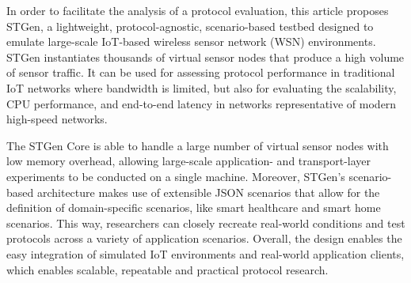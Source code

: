 \documentclass[jsan,article,submit,moreauthors,pdftex]{Definitions/mdpi}
\begin{document}
In order to facilitate the analysis of a protocol evaluation, this article proposes STGen, a lightweight, protocol-agnostic, scenario-based testbed designed to emulate large-scale IoT-based wireless sensor network (WSN) environments. STGen instantiates thousands of virtual sensor nodes that produce a high volume of sensor traffic. It can be used for assessing protocol performance in traditional IoT networks where bandwidth is limited, but also for evaluating the scalability, CPU performance, and end-to-end latency in networks representative of modern high-speed networks.

The STGen Core is able to handle a large number of virtual sensor nodes with low memory overhead, allowing large-scale application- and transport-layer experiments to be conducted on a single machine. Moreover, STGen's scenario-based architecture makes use of extensible JSON scenarios that allow for the definition of domain-specific scenarios, like smart healthcare and smart home scenarios. This way, researchers can closely recreate real-world conditions and test protocols across a variety of application scenarios. Overall, the design enables the easy integration of simulated IoT environments and real-world application clients, which enables scalable, repeatable and practical protocol research.




\end{document}
